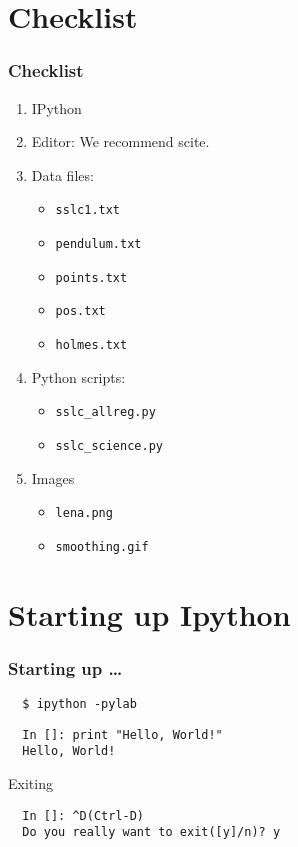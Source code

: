 \documentclass[14pt,compress]{beamer}
\newcommand{\typ}[1]{\lstinline{#1}}
\begin{document}
\section{Checklist}
\begin{frame}
\frametitle{Checklist}
  \begin{enumerate}
    \item IPython
    \item Editor: We recommend \alert{scite}.
    \item Data files: 
      \begin{itemize}
      \item \typ{sslc1.txt}
      \item \typ{pendulum.txt}
      \item \typ{points.txt}
      \item \typ{pos.txt}
      \item \typ{holmes.txt}
      \end{itemize}
    \item Python scripts: 
      \begin{itemize}
      \item \typ{sslc_allreg.py}
      \item \typ{sslc_science.py}
      \end{itemize}
    \item Images
      \begin{itemize}
      \item \typ{lena.png}
      \item \typ{smoothing.gif}
      \end{itemize}
  \end{enumerate}
\end{frame}

\section{Starting up Ipython}
\begin{frame}[fragile]
\frametitle{Starting up \ldots}
\begin{block}{}
\begin{lstlisting}
  $ ipython -pylab  
\end{lstlisting} %
\end{block}
\begin{lstlisting}     
  In []: print "Hello, World!"
  Hello, World!
\end{lstlisting}
Exiting
\begin{lstlisting}
  In []: ^D(Ctrl-D)
  Do you really want to exit([y]/n)? y
\end{lstlisting}
\end{frame}
\end{document}
